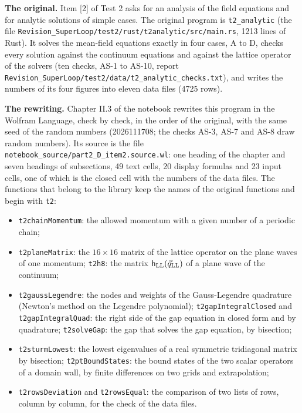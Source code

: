 \documentclass[
  10pt,
]{article}
\providecommand{\tightlist}{%
  \setlength{\itemsep}{0pt}\setlength{\parskip}{0pt}}
\begin{document}
\textbf{The original.} Item {[}2{]} of Test 2 asks for an analysis of
the field equations and for analytic solutions of simple cases. The
original program is \texttt{t2\_analytic} (the file
\texttt{Revision\_SuperLoop/test2/rust/t2analytic/src/main.rs}, 1213
lines of Rust). It solves the mean-field equations exactly in four
cases, A to D, checks every solution against the continuum equations and
against the lattice operator of the solvers (ten checks, AS-1 to AS-10,
report
\texttt{Revision\_SuperLoop/test2/data/t2\_analytic\_checks.txt}), and
writes the numbers of its four figures into eleven data files (4725
rows).

\textbf{The rewriting.} Chapter II.3 of the notebook rewrites this
program in the Wolfram Language, check by check, in the order of the
original, with the same seed of the random numbers (2026111708; the
checks AS-3, AS-7 and AS-8 draw random numbers). Its source is the file
\texttt{notebook\_source/part2\_D\_item2.source.wl}: one heading of the
chapter and seven headings of subsections, 49 text cells, 20 display
formulas and 23 input cells, one of which is the closed cell with the
numbers of the data files. The functions that belong to the library keep
the names of the original functions and begin with \texttt{t2}:

\begin{itemize}
\tightlist
\item
  \texttt{t2chainMomentum}: the allowed momentum with a given number of
  a periodic chain;
\item
  \texttt{t2planeMatrix}: the \(16\times16\) matrix of the lattice
  operator on the plane waves of one momentum; \texttt{t2h8}: the matrix
  \(\mathsf h_{\rm LL}(\vec q_{\rm LL})\) of a plane wave of the
  continuum;
\item
  \texttt{t2gaussLegendre}: the nodes and weights of the Gauss-Legendre
  quadrature (Newton's method on the Legendre polynomial);
  \texttt{t2gapIntegralClosed} and \texttt{t2gapIntegralQuad}: the right
  side of the gap equation in closed form and by quadrature;
  \texttt{t2solveGap}: the gap that solves the gap equation, by
  bisection;
\item
  \texttt{t2sturmLowest}: the lowest eigenvalues of a real symmetric
  tridiagonal matrix by bisection; \texttt{t2ptBoundStates}: the bound
  states of the two scalar operators of a domain wall, by finite
  differences on two grids and extrapolation;
\item
  \texttt{t2rowsDeviation} and \texttt{t2rowsEqual}: the comparison of
  two lists of rows, column by column, for the check of the data files.
\end{itemize}
\end{document}
